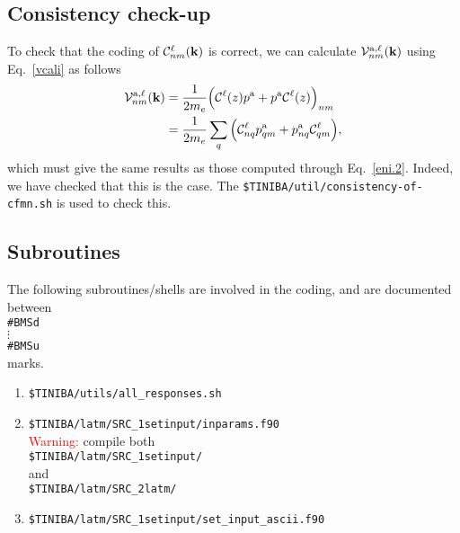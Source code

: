 \subsection{Consistency check-up}

To check that the coding of 
${\mathbf{\cal C}}^\ell_{nm}(\mathbf{k})$ 
is correct, we can calculate ${\mathbf{\cal V}}^{\mathrm{a},\ell}_{nm}(\mathbf{k})$ using
Eq.~\eqref{vcali} as follows
\begin{align}\label{ccu.1}
{\mathbf{\cal V}}^{\mathrm{a},\ell}_{nm}(\mathbf{k})
&=
\frac{1}{2m_e}
\Big(
{\mathbf{\cal C}}^\ell(z)p^{\mathrm{a}}
+
p^{\mathrm{a}}{\mathbf{\cal C}}^\ell(z)
\Big)_{nm}
\nonumber\\
&=
\frac{1}{2m_e}
\sum_q
\Big(
{\mathbf{\cal C}}^\ell_{nq}p^{\mathrm{a}}_{qm}
+
p^{\mathrm{a}}_{nq}{\mathbf{\cal C}}^\ell_{qm}
\Big)
,
\end{align}
which must give the same results as those computed through
Eq.~\eqref{eni.2}.
Indeed, we have checked that this is the case. The
\verb=$TINIBA/util/consistency-of-cfmn.sh=
is used to check this.

\subsection{Subroutines}

The following subroutines/shells are involved in the coding,
and are documented between\\
\verb=#BMSd=\\
$\vdots$\\
\verb=#BMSu=\\
marks.
\begin{enumerate}
\item \verb=$TINIBA/utils/all_responses.sh=
\item \verb=$TINIBA/latm/SRC_1setinput/inparams.f90=\\
\textcolor{red}{Warning:} compile both\\
\verb=$TINIBA/latm/SRC_1setinput/= \\
and\\
\verb=$TINIBA/latm/SRC_2latm/= 
\item \verb=$TINIBA/latm/SRC_1setinput/set_input_ascii.f90=\\
\end{enumerate}
